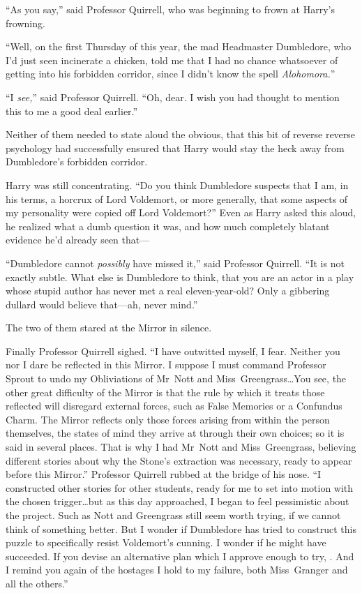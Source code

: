 “As you say,” said Professor Quirrell, who was beginning to frown at Harry’s
frowning.

“Well, on the first Thursday of this year, the mad Headmaster Dumbledore, who
I’d just seen incinerate a chicken, told me that I had no chance whatsoever of
getting into his forbidden corridor, since I didn’t know the spell
\emph{Alohomora.}”

“I \emph{see,}” said Professor Quirrell. “Oh, dear. I wish you had thought to
mention this to me a good deal earlier.”

Neither of them needed to state aloud the obvious, that this bit of reverse
reverse psychology had successfully ensured that Harry would stay the heck away
from Dumbledore’s forbidden corridor.

Harry was still concentrating. “Do you think Dumbledore suspects that I am, in
his terms, a horcrux of Lord Voldemort, or more generally, that some aspects of
my personality were copied off Lord Voldemort?” Even as Harry asked this aloud,
he realized what a dumb question it was, and how much completely blatant
evidence he’d already seen that—

“Dumbledore cannot \emph{possibly} have missed it,” said Professor Quirrell.
“It is not exactly subtle. What else is Dumbledore to think, that you are an
actor in a play whose stupid author has never met a real eleven-year-old? Only
a gibbering dullard would believe that—ah, never mind.”

The two of them stared at the Mirror in silence.

Finally Professor Quirrell sighed. “I have outwitted myself, I fear. Neither
you nor I dare be reflected in this Mirror. I suppose I must command Professor
Sprout to undo my Obliviations of Mr~Nott and Miss~Greengrass…You see,
the other great difficulty of the Mirror is that the rule by which it treats
those reflected will disregard external forces, such as False Memories or a
Confundus Charm. The Mirror reflects only those forces arising from within the
person themselves, the states of mind they arrive at through their own choices;
so it is said in several places. That is why I had Mr~Nott and
Miss~Greengrass, believing different stories about why the Stone’s extraction was
necessary, ready to appear before this Mirror.” Professor Quirrell rubbed at
the bridge of his nose. “I constructed other stories for other students, ready
for me to set into motion with the chosen trigger…but as this day
approached, I began to feel pessimistic about the project. Such as Nott and
Greengrass still seem worth trying, if we cannot think of something better. But
I wonder if Dumbledore has tried to construct this puzzle to specifically
resist Voldemort’s cunning. I wonder if he might have succeeded. If you devise
an alternative plan which I approve enough to try, . And I remind you again of the hostages I hold
to my failure, both Miss~Granger and all the others.”

